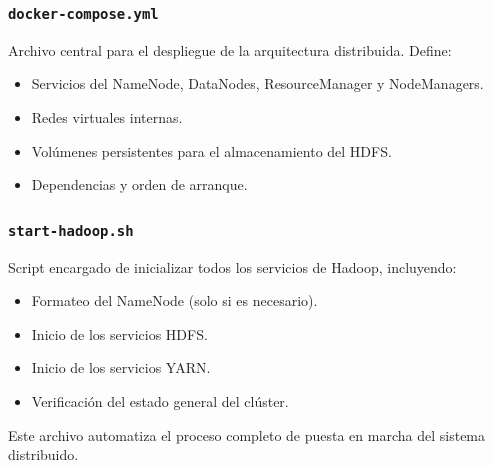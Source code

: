 \subsubsection{\texttt{docker-compose.yml}}

Archivo central para el despliegue de la arquitectura distribuida. Define:

\begin{itemize}
    \item Servicios del NameNode, DataNodes, ResourceManager y NodeManagers.
    \item Redes virtuales internas.
    \item Volúmenes persistentes para el almacenamiento del HDFS.
    \item Dependencias y orden de arranque.
\end{itemize}

\subsubsection{\texttt{start-hadoop.sh}}

Script encargado de inicializar todos los servicios de Hadoop, incluyendo:

\begin{itemize}
    \item Formateo del NameNode (solo si es necesario).
    \item Inicio de los servicios HDFS.
    \item Inicio de los servicios YARN.
    \item Verificación del estado general del clúster.
\end{itemize}

Este archivo automatiza el proceso completo de puesta en marcha del sistema distribuido.
